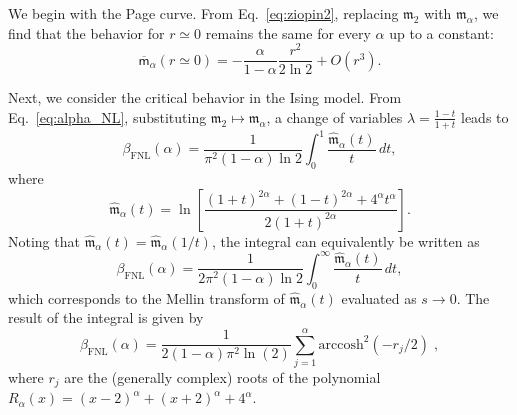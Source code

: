 \documentclass[prx,twocolumn,superscriptaddress,aps,10pt, frontmatterverbose, reprint,footinbib,longbibliography=true]{revtex4-2}
\begin{document}
We begin with the Page curve. From Eq.~\eqref{eq:ziopin2}, replacing $\mathfrak{m}_2$ with $\mathfrak{m}_\alpha$, we find that the behavior for $r \simeq 0$ remains the same for every $\alpha$ up to a constant:
\begin{equation}
\overline{\mathsf{m}}_\alpha(r \simeq 0) = - \frac{\alpha}{1-\alpha} \frac{r^2}{2 \ln 2} + O(r^3).
\end{equation}

Next, we consider the critical behavior in the Ising model. From Eq.~\eqref{eq:alpha_NL}, substituting $\mathfrak{m}_2 \mapsto \mathfrak{m}_\alpha$, a change of variables $\lambda = \frac{1-t}{1+t}$ leads to
\begin{equation}
\beta_{\mathrm{FNL}}(\alpha) = \frac{1}{\pi^2 (1-\alpha) \ln 2} \int_0^1 \frac{\hat{\mathfrak{m}}_\alpha(t)}{t}\, dt,
\end{equation}
where
\begin{equation}
\hat{\mathfrak{m}}_\alpha(t) = \ln \left[ \frac{(1+t)^{2\alpha} + (1-t)^{2\alpha} + 4^\alpha t^\alpha}{2 (1+t)^{2\alpha}} \right].
\end{equation}
Noting that $\hat{\mathfrak{m}}_\alpha(t) = \hat{\mathfrak{m}}_\alpha(1/t)$, the integral can equivalently be written as
\begin{equation}
\beta_{\mathrm{FNL}}(\alpha) = \frac{1}{2 \pi^2 (1-\alpha) \ln 2} \int_0^\infty \frac{\hat{\mathfrak{m}}_\alpha(t)}{t}\, dt,
\end{equation} 
which corresponds to the Mellin transform of $\hat{\mathfrak{m}}_\alpha(t)$ evaluated as $s \to 0$.
The result of the integral is given by 
\begin{equation}
\beta_{\mathrm{FNL}}(\alpha) = \frac{1}{2 (1-\alpha) \pi^2 \ln(2)}\sum_{j=1}^\alpha \mathrm{arccosh}^2(-r_j/2)\;,
\end{equation}
where $r_j$ are the (generally complex) roots of the polynomial $R_\alpha(x)=(x-2)^\alpha+(x+2)^\alpha+4^\alpha$.





\end{document}
